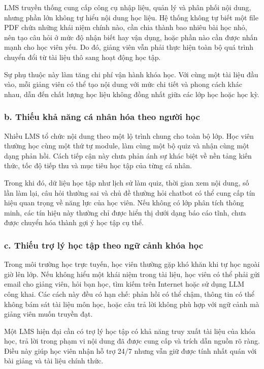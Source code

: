 LMS truyền thống cung cấp công cụ nhập liệu, quản lý và phân phối nội dung,
nhưng phần lớn không tự hiểu nội dung học liệu. Hệ thống không tự biết một file
PDF chứa những khái niệm chính nào, cần chia thành bao nhiêu bài học nhỏ, nên
tạo câu hỏi ở mức độ nhận biết hay vận dụng, hoặc phần nào cần được nhấn mạnh
cho học viên yếu. Do đó, giảng viên vẫn phải thực hiện toàn bộ quá trình chuyển
đổi từ tài liệu thô sang hoạt động học tập.

Sự phụ thuộc này làm tăng chi phí vận hành khóa học. Với cùng một tài liệu đầu
vào, mỗi giảng viên có thể tạo nội dung với mức chi tiết và phong cách khác
nhau, dẫn đến chất lượng học liệu không đồng nhất giữa các lớp học hoặc học kỳ.

\subsubsection*{b. Thiếu khả năng cá nhân hóa theo người học}

Nhiều LMS tổ chức nội dung theo một lộ trình chung cho toàn bộ lớp. Học viên
thường học cùng một thứ tự module, làm cùng một bộ quiz và nhận cùng một dạng
phản hồi. Cách tiếp cận này chưa phản ánh sự khác biệt về nền tảng kiến thức,
tốc độ tiếp thu và mục tiêu học tập của từng cá nhân.

Trong khi đó, dữ liệu học tập như lịch sử làm quiz, thời gian xem nội dung, số
lần làm lại, câu hỏi thường sai và chủ đề thường hỏi chatbot có thể cung cấp
tín hiệu quan trọng về năng lực của học viên. Nếu không có lớp phân tích thông
minh, các tín hiệu này thường chỉ được hiển thị dưới dạng báo cáo tĩnh, chưa
được chuyển hóa thành gợi ý học tập cụ thể.

\subsubsection*{c. Thiếu trợ lý học tập theo ngữ cảnh khóa học}

Trong môi trường học trực tuyến, học viên thường gặp khó khăn khi tự học ngoài
giờ lên lớp. Nếu không hiểu một khái niệm trong tài liệu, học viên có thể phải
gửi email cho giảng viên, hỏi bạn học, tìm kiếm trên Internet hoặc sử dụng LLM
công khai. Các cách này đều có hạn chế: phản hồi có thể chậm, thông tin có thể
không bám sát tài liệu môn học, hoặc câu trả lời không phù hợp với ngữ cảnh mà
giảng viên muốn truyền đạt.

Một LMS hiện đại cần có trợ lý học tập có khả năng truy xuất tài liệu của khóa
học, trả lời trong phạm vi nội dung đã được cung cấp và trích dẫn nguồn rõ
ràng. Điều này giúp học viên nhận hỗ trợ 24/7 nhưng vẫn giữ được tính nhất quán
với bài giảng và tài liệu chính thức.

